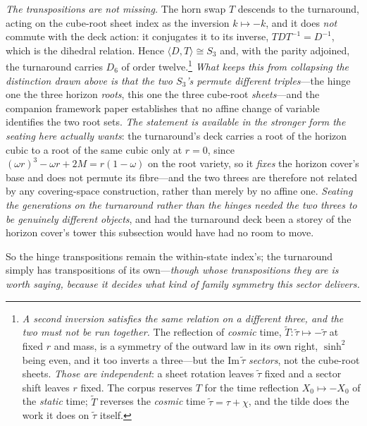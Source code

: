 \documentclass[11pt]{article}
\begin{document}
\emph{The transpositions are not missing.} The horn swap $T$ descends to the turnaround, acting on the
cube-root sheet index as the inversion $k\mapsto-k$, and it does \emph{not} commute with the deck action:
it conjugates it to its inverse, $TDT^{-1}=D^{-1}$, which is the dihedral relation. Hence
$\langle D,T\rangle\cong S_{3}$ and, with the parity adjoined, the turnaround carries $D_{6}$ of order
twelve.\footnote{\emph{A second inversion satisfies the same relation on a different three, and the two
must not be run together.} The reflection of \emph{cosmic} time, $\widetilde{T}:\tilde\tau\mapsto-\tilde\tau$
at fixed $r$ and mass, is a symmetry of the outward law in its own right, $\sinh^{2}$ being even, and it too
inverts a three---but the $\mathrm{Im}\,\tilde\tau$ \emph{sectors}, not the cube-root sheets. \emph{Those are
independent}: a sheet rotation leaves $\tilde\tau$ fixed and a sector shift leaves $r$ fixed. The corpus
reserves $T$ for the time reflection $X_{0}\mapsto-X_{0}$ of the \emph{static} time; $\widetilde{T}$ reverses
the \emph{cosmic} time $\tilde\tau=\tau+\chi$, and the tilde does the work it does on $\tilde\tau$ itself.}
\emph{What keeps this from collapsing the distinction drawn above is that the two $S_{3}$'s permute
different triples}---the hinge one the three horizon \emph{roots}, this one the three cube-root
\emph{sheets}---and the companion framework paper establishes that no affine change of
variable identifies the two root sets. \emph{The statement is available in the stronger form the seating here
actually wants}: the turnaround's deck carries a root of the horizon cubic to a root of the same cubic only at
$r=0$, since $(\omega r)^{3}-\omega r+2M=r(1-\omega)$ on the root variety, so it \emph{fixes} the horizon
cover's base and does not permute its fibre---and the two threes are therefore not related by any
covering-space construction, rather than merely by no affine
one. \emph{Seating the generations on the turnaround rather
than the hinges needed the two threes to be genuinely different objects}, and had the turnaround deck been a
storey of the horizon cover's tower this subsection would have had no room to move. 

So the hinge transpositions remain the within-state index's; the
turnaround simply has transpositions of its own---\emph{though whose transpositions they are is worth saying,
because it decides what kind of family symmetry this sector delivers.}
\end{document}
